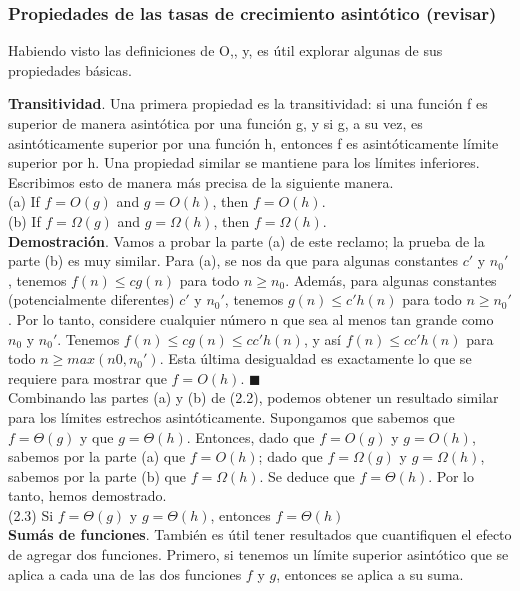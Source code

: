 \documentclass[a4paper]{article}
\begin{document}
\subsubsection*{Propiedades de las tasas de crecimiento asintótico (revisar)}

Habiendo visto las definiciones de O,, y, es útil explorar algunas de sus propiedades básicas.

\textbf{Transitividad}. Una primera propiedad es la transitividad: si una función f es superior de manera asintótica por una función g, y si g, a su vez, es asintóticamente superior por una función h, entonces f es asintóticamente límite superior por h. Una propiedad similar se mantiene para los límites inferiores. Escribimos esto de manera más precisa de la siguiente manera.\\

(a) If \(f=O(g)\) and \(g=O(h)\), then \(f=O(h)\).\\

(b) If \(f=\Omega(g)\) and \(g=\Omega(h)\), then \(f=\Omega(h)\).\\
 
\textbf{Demostración}.  Vamos a probar la parte (a) de este reclamo; la prueba de la parte (b) es muy similar. Para (a), se nos da que para algunas constantes $c'$ y $n_0'$, tenemos $f(n)≤cg(n)$ para todo $n≥n_0$. Además, para algunas constantes (potencialmente diferentes) $c'$ y $n_0'$, tenemos $g(n)≤c'h(n)$ para todo $n ≥ n_0'$. Por lo tanto, considere cualquier número n que sea al menos tan grande como $n_0$ y $n_0'$. Tenemos $f(n)≤cg(n) ≤ cc'h(n)$, y así $f(n)≤cc'h(n)$ para todo $n≥max(n0, n_0')$. Esta última desigualdad es exactamente lo que se requiere para mostrar que $f=O(h)$. $\blacksquare$ \\

Combinando las partes (a) y (b) de (2.2), podemos obtener un resultado similar para los límites estrechos asintóticamente. Supongamos que sabemos que $f=\Theta(g)$ y que $g=\Theta(h)$. Entonces, dado que $f=O(g)$ y $g=O(h)$, sabemos por la parte (a) que $f=O(h)$; dado que $f=\Omega(g)$ y $g=\Omega(h)$, sabemos por la parte (b) que $f=\Omega(h)$. Se deduce que $f=\Theta(h)$. Por lo tanto, hemos demostrado.\\

(2.3) Si $f=\Theta(g)$ y $g=\Theta(h)$, entonces $f=\Theta(h)$\\

\textbf{Sumás de funciones}. También es útil tener resultados que cuantifiquen el efecto de agregar dos funciones. Primero, si tenemos un límite superior asintótico que se aplica a cada una de las dos funciones $f$ y $g$, entonces se aplica a su suma.\\
\end{document}
